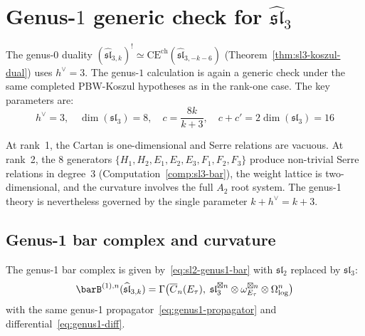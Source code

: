\section{\texorpdfstring{Genus-$1$ generic check for $\widehat{\mathfrak{sl}}_3$}{Genus-1 generic check for sl-3}}
\label{sec:sl3-genus-one-computation}

The genus-0 duality
\((\widehat{\mathfrak{sl}}_{3,k})^! \simeq
\mathrm{CE}^{\mathrm{ch}}(\widehat{\mathfrak{sl}}_{3,-k-6})\)
(Theorem~\ref{thm:sl3-koszul-dual}) uses $h^\vee = 3$.  The genus-$1$
calculation is again a generic check under the same completed
PBW-Koszul hypotheses as in the rank-one case. The key parameters are:
\begin{equation}\label{eq:sl3-parameters}
h^\vee = 3, \quad \dim(\mathfrak{sl}_3) = 8, \quad c = \frac{8k}{k+3}, \quad c + c' = 2\dim(\mathfrak{sl}_3) = 16
\end{equation}

At rank~1, the Cartan is one-dimensional and Serre relations are vacuous. At rank~2, the 8 generators $\{H_1, H_2, E_1, E_2, E_3, F_1, F_2, F_3\}$ produce non-trivial Serre relations in degree~3 (Computation~\ref{comp:sl3-bar}), the weight lattice is two-dimensional, and the curvature involves the full $A_2$ root system. The genus-1 theory is nevertheless governed by the single parameter $k + h^\vee = k + 3$.

\subsection{Genus-1 bar complex and curvature}

The genus-1 bar complex is given by~\eqref{eq:sl2-genus1-bar} with $\mathfrak{sl}_2$ replaced by $\mathfrak{sl}_3$:
\begin{equation}\label{eq:sl3-genus1-bar}
\barB^{(1),n}(\widehat{\mathfrak{sl}}_{3,k}) = \Gamma\bigl(\overline{C}_n(E_\tau),\; \mathfrak{sl}_3^{\boxtimes n} \otimes \omega_{E_\tau}^{\boxtimes n} \otimes \Omega^n_{\log}\bigr)
\end{equation}
with the same genus-1 propagator~\eqref{eq:genus1-propagator} and differential~\eqref{eq:genus1-diff}.


